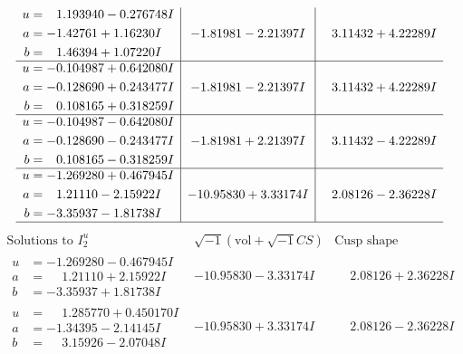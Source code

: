 \documentclass[1p]{elsarticle_modified}
\theoremstyle{definition}
\newcommand{\I}{\sqrt{-1}}
\begin{document}
$$\begin{array}{c|c|c}
\begin{aligned}
u &= \phantom{-}1.193940 - 0.276748 I \\
a &= -1.42761 + 1.16230 I \\
b &= \phantom{-}1.46394 + 1.07220 I\end{aligned}
 & -1.81981 - 2.21397 I & \phantom{-}3.11432 + 4.22289 I \\ \hline\begin{aligned}
u &= -0.104987 + 0.642080 I \\
a &= -0.128690 + 0.243477 I \\
b &= \phantom{-}0.108165 + 0.318259 I\end{aligned}
 & -1.81981 - 2.21397 I & \phantom{-}3.11432 + 4.22289 I \\ \hline\begin{aligned}
u &= -0.104987 - 0.642080 I \\
a &= -0.128690 - 0.243477 I \\
b &= \phantom{-}0.108165 - 0.318259 I\end{aligned}
 & -1.81981 + 2.21397 I & \phantom{-}3.11432 - 4.22289 I \\ \hline\begin{aligned}
u &= -1.269280 + 0.467945 I \\
a &= \phantom{-}1.21110 - 2.15922 I \\
b &= -3.35937 - 1.81738 I\end{aligned}
 & -10.95830 + 3.33174 I & \phantom{-}2.08126 - 2.36228 I\\
 \hline 
 \end{array}$$\newpage$$\begin{array}{c|c|c}  
\text{Solutions to }I^u_{2}& \I (\text{vol} + \sqrt{-1}CS) & \text{Cusp shape}\\
 \hline 
\begin{aligned}
u &= -1.269280 - 0.467945 I \\
a &= \phantom{-}1.21110 + 2.15922 I \\
b &= -3.35937 + 1.81738 I\end{aligned}
 & -10.95830 - 3.33174 I & \phantom{-}2.08126 + 2.36228 I \\ \hline\begin{aligned}
u &= \phantom{-}1.285770 + 0.450170 I \\
a &= -1.34395 - 2.14145 I \\
b &= \phantom{-}3.15926 - 2.07048 I\end{aligned}
 & -10.95830 + 3.33174 I & \phantom{-}2.08126 - 2.36228 I \\ \hline\begin{aligned}

\end{aligned}
\end{array}$$
\end{document}
